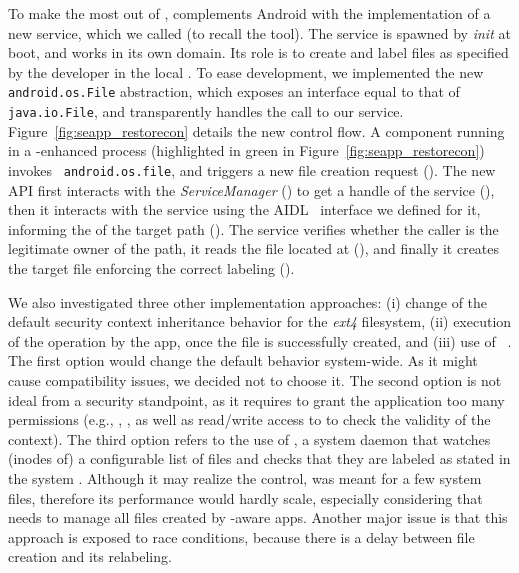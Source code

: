To make the most out of \sel, \pap complements Android with the
implementation of a new service, which we called \restorecon (to
recall the \sel \restoreconc tool).  The \restorecon service is
spawned by {\em init} at boot, and works in its own \sel domain.  Its
role is to create and label files as specified by the developer in the
local \filecontexts.  To ease development, we implemented the new {\tt
  android.os.File} abstraction, which exposes an interface equal to
that of {\tt java.io.File}, and transparently handles the call to our
service.  Figure~\ref{fig:seapp_restorecon} details the new control
flow.  A component running in a \pap-enhanced process (highlighted in
green in Figure~\ref{fig:seapp_restorecon}) invokes {\tt
  android.os.file}, and triggers a new file creation request
().  The new API first interacts with the {\em
  ServiceManager} () to get a handle of the \restorecon
service (), then it interacts with the service using
the AIDL~\cite{seapp_aaidl} interface we defined for it, informing the
\restorecon of the target path ().  The \restorecon
service verifies whether the caller is the legitimate owner of the
path, it reads the \filecontexts file located at \dataselinuxdir
(), and finally it creates the target file enforcing
the correct labeling ().

We also investigated three other implementation approaches: (i) change
of the default security context inheritance behavior for the {\em
  ext4} filesystem, (ii) execution of the \sel \restorecon operation
by the app, once the file is successfully created, and (iii) use of
\restorecond~\cite{seapp_restorecondd}.  The first option would change
the default behavior system-wide.  As it might cause compatibility
issues, we decided not to choose it.  The second option is not ideal
from a security standpoint, as it requires to grant the application
too many permissions (e.g., \relabelfrom, \relabelto, as well as
read/write access to \selinuxfs to check the validity of the \sel
context).  The third option refers to the use of \restorecond, a
system daemon that watches (inodes of) a configurable list of files
and checks that they are labeled as stated in the system
\filecontexts.  Although it may realize the control, \restorecond was
meant for a few system files, therefore its performance would hardly
scale, especially considering that \pap needs to manage all files
created by \pap-aware apps.  Another major issue is that this approach
is exposed to race conditions, because there is a delay between file
creation and its relabeling.

